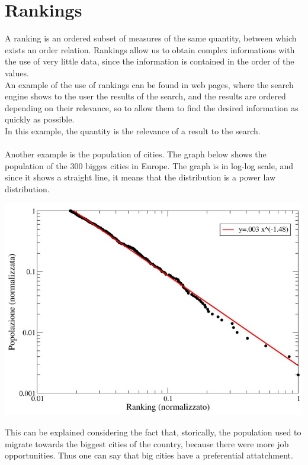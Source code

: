 \chapter{Rankings}
A ranking is an ordered subset of measures of the same quantity, between which exists an order relation. Rankings allow us to obtain complex informations with the use of very little data, since the information is contained in the order of the values. \\ 
An example of the use of rankings can be found in web pages, where the search engine shows to the user the results of the search, and the results are ordered depending on their relevance, so to allow them to find the desired information as quickly as possible. \\
In this example, the quantity is the relevance of a result to the search. \\ \\
Another example is the population of cities. The graph below shows the population of the 300 bigges cities in Europe. The graph is in log-log scale, and since it shows a straight line, it means that the distribution is a power law distribution. \\
\begin{center}
	\includegraphics[scale=0.65]{cities_ranking.jpg}
\end{center}
This can be explained considering the fact that, storically, the population used to migrate towards the biggest cities of the country, because there were more job opportunities. Thus one can say that big cities have a preferential attatchment. \\ \\ 
